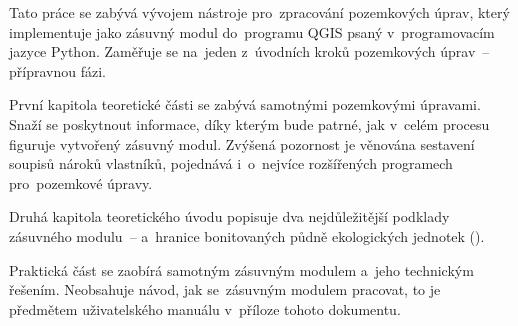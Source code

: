 Tato práce se zabývá vývojem nástroje pro~zpracování pozemkových
úprav, který implementuje jako zásuvný modul do~programu QGIS psaný
v~programovacím jazyce Python. Zaměřuje se na~jeden z~úvodních kroků
pozemkových úprav~– přípravnou fázi.

První kapitola teoretické části se zabývá samotnými pozemkovými
úpravami. Snaží se poskytnout informace, díky kterým bude patrné, jak
v~celém procesu figuruje vytvořený zásuvný modul. Zvýšená pozornost je
věnována sestavení soupisů nároků vlastníků, pojednává i~o~nejvíce
rozšířených programech pro~pozemkové úpravy.

Druhá kapitola teoretického úvodu popisuje dva nejdůležitější podklady
zásuvné\-ho modulu~–  a~hranice bonitovaných půdně
ekologických jednotek ().

Praktická část se zaobírá samotným zásuvným modulem a~jeho technickým
řešením. Neobsahuje návod, jak se~zásuvným modulem pracovat, to je
předmětem uživatelského manuálu v~příloze tohoto dokumentu.
